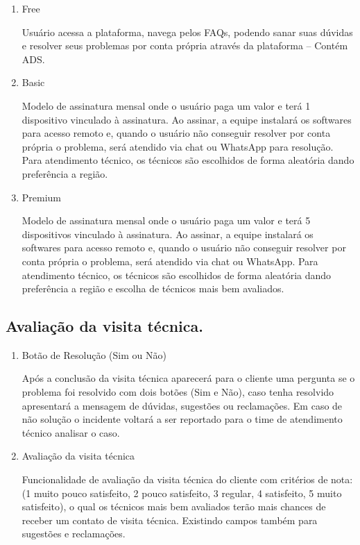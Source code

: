 \documentclass[
    12pt,               %
    openright,          %
    oneside,
    a4paper,            %
    MODELO,             %
    english,            %
    brazil              %
   ]{ifsp-spo-inf-ctds}
\begin{document}
	\begin{enumerate}
		
		\item Free
		
		Usuário acessa a plataforma, navega pelos FAQs, podendo sanar suas dúvidas e resolver seus problemas por conta própria através da plataforma – Contém ADS.
		
		\item Basic
		
		Modelo de assinatura mensal onde o usuário paga um valor e terá 1 dispositivo vinculado à assinatura. Ao assinar, a equipe instalará os softwares para acesso remoto e, quando o usuário não conseguir resolver por conta própria o problema, será atendido via chat ou WhatsApp para resolução. Para atendimento técnico, os técnicos são escolhidos de forma aleatória dando preferência a região.
		
		\item Premium
		
		Modelo de assinatura mensal onde o usuário paga um valor e terá 5 dispositivos vinculado à assinatura. Ao assinar, a equipe instalará os softwares para acesso remoto e, quando o usuário não conseguir resolver por conta própria o problema, será atendido via chat ou WhatsApp. Para atendimento técnico, os técnicos são escolhidos de forma aleatória dando preferência a região e escolha de técnicos mais bem avaliados.
		
	\end{enumerate}

\subsection{Avaliação da visita técnica.}

	\begin{enumerate}
		
		\item Botão de Resolução (Sim ou Não)
		
		Após a conclusão da visita técnica aparecerá para o cliente uma pergunta se o problema foi resolvido com dois botões (Sim e Não), caso tenha resolvido apresentará a mensagem de dúvidas, sugestões ou reclamações. Em caso de não solução o incidente voltará a ser reportado para o time de atendimento técnico analisar o caso. 
		
		\item Avaliação da visita técnica
		
		Funcionalidade de avaliação da visita técnica do cliente com critérios de nota:(1 muito pouco satisfeito, 2 pouco satisfeito, 3 regular, 4 satisfeito, 5 muito satisfeito), o qual os técnicos mais bem avaliados terão mais chances de receber um contato de visita técnica. Existindo campos também para sugestões e reclamações.
		
	\end{enumerate}
\end{document}
